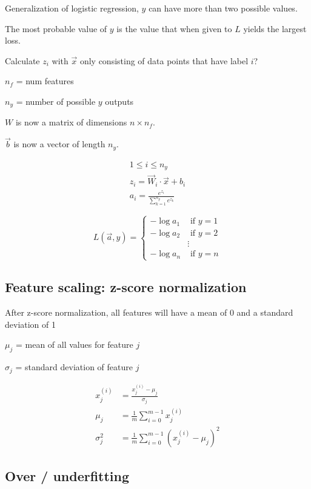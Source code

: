 \documentclass[12pt]{article}
\begin{document}
Generalization of logistic regression, $y$ can have more than two possible values.

The most probable value of $y$ is the value that when given to $L$ yields the largest loss.

Calculate $z_i$ with $\vec{x}$ only consisting of data points that have label $i$?

$n_f$ = num features

$n_y$ = number of possible $y$ outputs

$W$ is now a matrix of dimensions $n \times n_f$.

$\vec{b}$ is now a vector of length $n_y$.

\begin{gather*}
1 \leq i \leq n_y\\
z_i = \vec{W}_i \cdot \vec{x} + b_i\\
a_i = \frac{e^{z_i}}{\sum_{k=1}^{n_y} e^{z_k}}
\end{gather*}

\begin{equation}
L(\vec{a}, y) =
  \left\{
    \begin{aligned}
    -\log a_1 &\text{ if } y = 1\\
    -\log a_2 &\text{ if } y = 2\\
    & \vdots\\
    -\log a_n &\text{ if } y = n
    \end{aligned}
   \right.
\end{equation}

\subsection{Feature scaling: z-score normalization}

After z-score normalization, all features will have a mean of 0 and a standard deviation of 1

$\mu_j$ = mean of all values for feature $j$

$\sigma_j$ = standard deviation of feature $j$

\begin{align*}
x_j^{(i)} &= \frac{x_j^{(i)} - \mu_j}{\sigma_j}\\
\mu_j &= \frac{1}{m} \sum_{i=0}^{m-1} x_j^{(i)}\\
\sigma_j^2 &= \frac{1}{m} \sum_{i=0}^{m-1} (x_j^{(i)} - \mu_j)^2
\end{align*}

\subsection{Over / underfitting}
\end{document}

